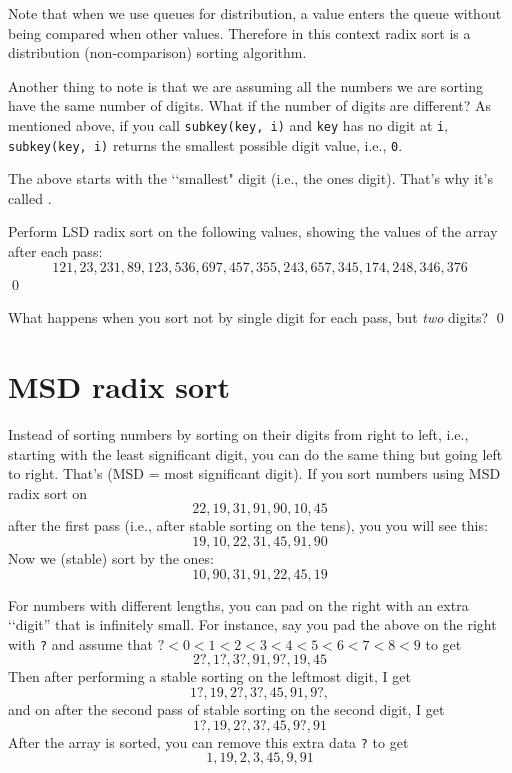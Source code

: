 Note that when we use queues for distribution, a value
enters the queue without being compared when other values.
Therefore in this context radix sort is a distribution (non-comparison) sorting
algorithm.

Another thing to note is that we are assuming all the numbers
we are sorting have the same number of digits.
What if the number of digits are different?
As mentioned above, if you call \verb!subkey(key, i)!
and \verb!key! has no digit at \verb!i!,
\verb!subkey(key, i)! returns the smallest possible digit value, i.e., \verb!0!.

The above starts with the \lq\lq smallest" digit (i.e., the ones digit).
That's why it's called .

\newpage

\begin{ex}
  Perform LSD radix sort on the following values, showing the
  values of the array after each pass:
  \[
    121, 23, 231, 89, 123, 536, 697, 457, 355, 243, 657, 345, 174, 248, 346, 376
  \]
  \qed
\end{ex}

\begin{ex}
What happens when you sort not by single digit for each pass, but
\textit{two} digits?
\qed
\end{ex}



\newpage
\section{MSD radix sort}

Instead of sorting numbers by sorting on their digits from right to left, i.e.,
starting with the least significant digit,
you can do the same thing but going left to right.
That's  (MSD = most significant digit).
If you
sort numbers using MSD
radix sort on
\[
22, 19, 31, 91, 90, 10, 45
\]
after the first pass (i.e., after stable sorting on the tens), you 
you will see this:
\[
19, 10, 22, 31, 45, 91, 90
\]
Now we (stable) sort by the ones:
\[
10, 90, 31, 91, 22, 45, 19
\]




For numbers with different lengths, you can
pad on the right with an extra \lq\lq digit'' that is infinitely small.
For instance, say you pad the above on the right with \verb!?!
and assume that $? < 0 < 1 < 2 < 3 < 4 < 5 < 6 < 7 < 8 < 9$ to get
\[
2?, 1?, 3?, 91, 9?, 19, 45
\]
Then after performing a stable sorting on the leftmost digit, I get
\[
1?, 19, 2?, 3?, 45, 91, 9?, 
\]
and on after the second pass of stable sorting on the second digit, I get
\[
1?, 19, 2?, 3?, 45, 9?, 91  
\]
After the array is sorted, you can remove this extra data \verb!?! to get
\[
1, 19, 2, 3, 45, 9, 91  
\]

